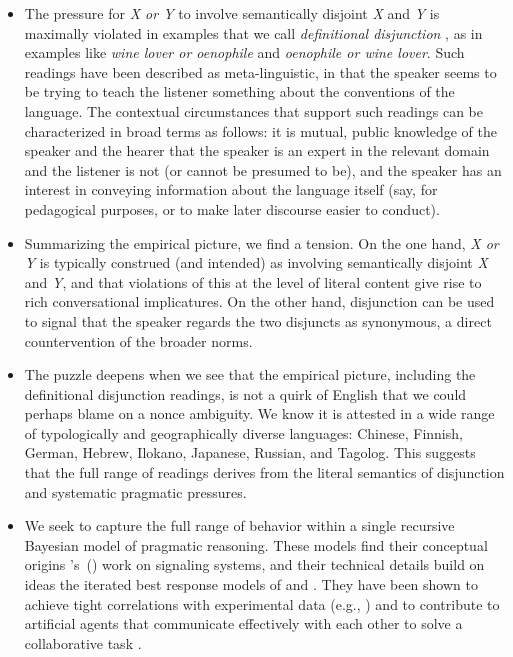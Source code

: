 \documentclass[12pt]{article}
\newcommand{\word}[1]{\emph{#1}}
\newcommand{\posscitet}[1]{\citeauthor{#1}'s~(\citeyear{#1})}
\begin{document}
\begin{itemize}
\begin{itemize}
\end{itemize}

\item 
The pressure for \word{X or Y} to involve semantically disjoint
\word{X} and \word{Y} is maximally violated in examples that we call
\word{definitional disjunction} \citep{Horn89,Rohdenburg:1985}, as in
examples like \word{wine lover or oenophile} and \word{oenophile or
  wine lover}. Such readings have been described as meta-linguistic,
in that the speaker seems to be trying to teach the listener something
about the conventions of the language. The contextual circumstances
that support such readings can be characterized in broad terms as
follows: it is mutual, public knowledge of the speaker and the hearer
that the speaker is an expert in the relevant domain and the listener
is not (or cannot be presumed to be), and the speaker has an interest
in conveying information about the language itself (say, for
pedagogical purposes, or to make later discourse easier to conduct).

\item
Summarizing the empirical picture, we find a tension. On the one hand,
\word{X or Y} is typically construed (and intended) as involving
semantically disjoint \word{X} and \word{Y}, and that violations of
this at the level of literal content give rise to rich conversational
implicatures. On the other hand, disjunction can be used to signal
that the speaker regards the two disjuncts as synonymous, a direct
countervention of the broader norms.

\item
The puzzle deepens when we see that the empirical picture, including
the definitional disjunction readings, is not a quirk of English that
we could perhaps blame on a nonce ambiguity. We know it is attested in
a wide range of typologically and geographically diverse languages:
Chinese, Finnish, German, Hebrew, Ilokano, Japanese, Russian, and
Tagolog. This suggests that the full range of readings derives from
the literal semantics of disjunction and systematic pragmatic
pressures.

\item
We seek to capture the full range of behavior within a single
recursive Bayesian model of pragmatic reasoning. These models find
their conceptual origins \posscitet{Lewis69} work on signaling
systems, and their technical details build on ideas the iterated best
response models of \citet{Jaeger:2007} and \citet{Franke09DISS}. They
have been shown to achieve tight correlations with experimental data
(e.g., \citealt{Frank:Goodman:2012}) and to contribute to artificial
agents that communicate effectively with each other to solve a
collaborative task \citep{Vogel-etal:2013}.


\end{itemize}
\end{document}
